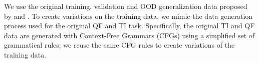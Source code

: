 We use the original training, validation and OOD generalization data proposed by \citet{McCoy2018-uv} and \citet{McCoy2020-pj}. To create variations on the training data, we mimic the data generation process used for the original QF and TI task. Specifically, the original TI and QF data are generated with Context-Free Grammars (CFGs) using a simplified set of grammatical rules; we reuse the same CFG rules to create variations of the training data. 

